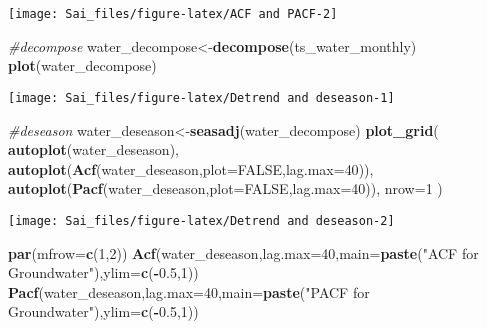 \documentclass[
]{article}
\newenvironment{Shaded}{\begin{snugshade}}{\end{snugshade}}
\newcommand{\AttributeTok}[1]{\textcolor[rgb]{0.13,0.29,0.53}{#1}}
\newcommand{\CommentTok}[1]{\textcolor[rgb]{0.56,0.35,0.01}{\textit{#1}}}
\newcommand{\ConstantTok}[1]{\textcolor[rgb]{0.56,0.35,0.01}{#1}}
\newcommand{\DecValTok}[1]{\textcolor[rgb]{0.00,0.00,0.81}{#1}}
\newcommand{\FloatTok}[1]{\textcolor[rgb]{0.00,0.00,0.81}{#1}}
\newcommand{\FunctionTok}[1]{\textcolor[rgb]{0.13,0.29,0.53}{\textbf{#1}}}
\newcommand{\NormalTok}[1]{#1}
\newcommand{\OtherTok}[1]{\textcolor[rgb]{0.56,0.35,0.01}{#1}}
\newcommand{\SpecialCharTok}[1]{\textcolor[rgb]{0.81,0.36,0.00}{\textbf{#1}}}
\newcommand{\StringTok}[1]{\textcolor[rgb]{0.31,0.60,0.02}{#1}}
\begin{document}
\begin{center}\texttt{[image: Sai\_files/figure-latex/ACF and PACF-2]} \end{center}

\begin{Shaded}
\begin{Highlighting}[]
\CommentTok{\#decompose }
\NormalTok{water\_decompose}\OtherTok{\textless{}{-}}\FunctionTok{decompose}\NormalTok{(ts\_water\_monthly)}
\FunctionTok{plot}\NormalTok{(water\_decompose)}
\end{Highlighting}
\end{Shaded}

\begin{center}\texttt{[image: Sai\_files/figure-latex/Detrend and deseason-1]} \end{center}

\begin{Shaded}
\begin{Highlighting}[]
\CommentTok{\#deseason}
\NormalTok{water\_deseason}\OtherTok{\textless{}{-}}\FunctionTok{seasadj}\NormalTok{(water\_decompose)}
\FunctionTok{plot\_grid}\NormalTok{(}
  \FunctionTok{autoplot}\NormalTok{(water\_deseason),}
  \FunctionTok{autoplot}\NormalTok{(}\FunctionTok{Acf}\NormalTok{(water\_deseason,}\AttributeTok{plot=}\ConstantTok{FALSE}\NormalTok{,}\AttributeTok{lag.max=}\DecValTok{40}\NormalTok{)),}
  \FunctionTok{autoplot}\NormalTok{(}\FunctionTok{Pacf}\NormalTok{(water\_deseason,}\AttributeTok{plot=}\ConstantTok{FALSE}\NormalTok{,}\AttributeTok{lag.max=}\DecValTok{40}\NormalTok{)),}
  \AttributeTok{nrow=}\DecValTok{1}
\NormalTok{)}
\end{Highlighting}
\end{Shaded}

\begin{center}\texttt{[image: Sai\_files/figure-latex/Detrend and deseason-2]} \end{center}

\begin{Shaded}
\begin{Highlighting}[]
\FunctionTok{par}\NormalTok{(}\AttributeTok{mfrow=}\FunctionTok{c}\NormalTok{(}\DecValTok{1}\NormalTok{,}\DecValTok{2}\NormalTok{))}
\FunctionTok{Acf}\NormalTok{(water\_deseason,}\AttributeTok{lag.max=}\DecValTok{40}\NormalTok{,}\AttributeTok{main=}\FunctionTok{paste}\NormalTok{(}\StringTok{"ACF for Groundwater"}\NormalTok{),}\AttributeTok{ylim=}\FunctionTok{c}\NormalTok{(}\SpecialCharTok{{-}}\FloatTok{0.5}\NormalTok{,}\DecValTok{1}\NormalTok{)) }
\FunctionTok{Pacf}\NormalTok{(water\_deseason,}\AttributeTok{lag.max=}\DecValTok{40}\NormalTok{,}\AttributeTok{main=}\FunctionTok{paste}\NormalTok{(}\StringTok{"PACF for Groundwater"}\NormalTok{),}\AttributeTok{ylim=}\FunctionTok{c}\NormalTok{(}\SpecialCharTok{{-}}\FloatTok{0.5}\NormalTok{,}\DecValTok{1}\NormalTok{))}
\end{Highlighting}
\end{Shaded}
\end{document}
